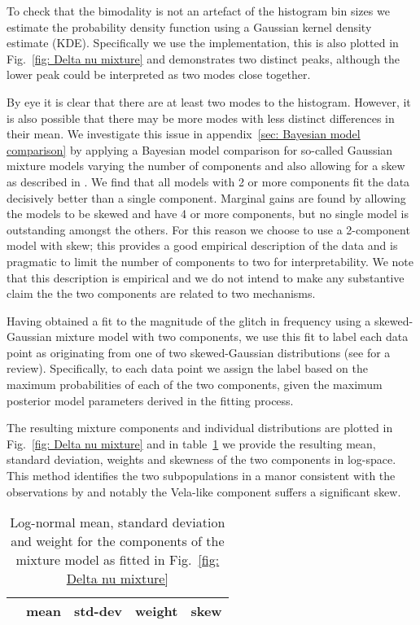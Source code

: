 \documentclass[../full_thesis/full_thesis.tex]{subfiles}
\newcommand{\thisdir}{../glitches_in_CGW}
\begin{document}
To check that the bimodality is not an artefact of the histogram bin sizes we
estimate the probability density function using a Gaussian kernel density
estimate (KDE). Specifically we use the \citet{Scipy} implementation, this is
also plotted in Fig.~\ref{fig: Delta nu mixture} and demonstrates two distinct
peaks, although the lower peak could be interpreted as two modes close together.

By eye it is clear that there are at least two modes to the histogram. However,
it is also possible that there may be more modes with less distinct differences
in their mean. We investigate this issue in appendix~\ref{sec: Bayesian model
comparison} by applying a Bayesian model comparison for so-called Gaussian
mixture models varying the number of components and also allowing for a skew as
described in \citet{Ohagan1976}.  We find that all models with 2 or more
components fit the data decisively better than a single component. Marginal
gains are found by allowing the models to be skewed and have 4 or more
components, but no single model is outstanding amongst the others. For this
reason we choose to use a 2-component model with skew; this provides a good
empirical description of the data and is pragmatic to limit the number of
components to two for interpretability. We note that this description is
empirical and we do not intend to make any substantive claim the the two components
are related to two mechanisms.

Having obtained a fit to the magnitude of the glitch in frequency using a
skewed-Gaussian mixture model with two components, we use this fit to label
each data point as originating from one of two skewed-Gaussian distributions
(see \citet{gelman2013bayesian} for a review). Specifically, to each data point
we assign the label based on the maximum probabilities of each of the two
components, given the maximum posterior model parameters derived in the fitting
process.

The resulting mixture components and individual
distributions are plotted in Fig.~\ref{fig: Delta nu mixture} and in
table~\ref{tab: mixture components} we provide the resulting mean, standard
deviation, weights and skewness of the two components in log-space.
This method identifies the two subpopulations in a manor consistent with the
observations by \citet{Espinoza2011} and notably the Vela-like component suffers
a significant skew.

\begin{table}[htb]
\begin{tabular}{lcccc}
& mean & std-dev & weight & skew \\ \hline

\end{tabular}
\caption{Log-normal mean, standard deviation and weight for the components of
the mixture model as fitted in Fig.~\ref{fig: Delta nu mixture}}
\label{tab: mixture components}
\end{table}
\end{document}
